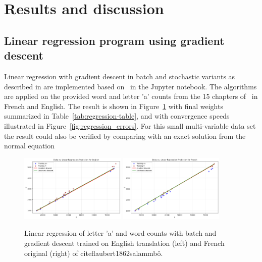 \documentclass[a4paper]{article}
\begin{document}
 
\section{Results and discussion}


\subsection{Linear regression program using gradient descent}

Linear regression with gradient descent in batch and stochastic variants as described in \cite[pp. 694--697]{aima} are implemented based on~\cite{nugues_lectures_2025} in the Jupyter notebook. The algorithms are applied on the provided word and letter 'a' counts from the 15 chapters of~\cite{flaubert1862salammbô} in French and English. The result is shown in Figure~\ref{fig:regression_English_French} with final weights  summarized in Table~\ref{tab:regression-table}, and with convergence speeds illustrated in Figure~\ref{fig:regression_errors}.  For this small multi-variable data set the result could also be verified by comparing with an exact solution from the normal equation\cite[Equation (19.7)]{aima}
\begin{figure}
    \centering
    \includegraphics[width=0.45\textwidth]{figures/Fit English.png}
    \includegraphics[width=0.45\textwidth]{figures/Fit French.png}
    \caption{Linear regression of letter 'a' and word counts with batch and gradient descent trained on English translation (left) and French original (right) of cite{flaubert1862salammbô}.}
    \label{fig:regression_English_French}
\end{figure}
\end{document}
